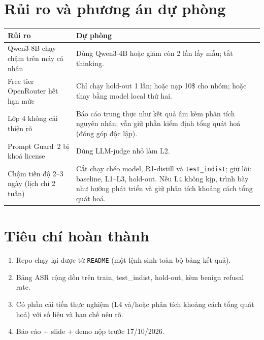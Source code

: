 \documentclass[11pt,a4paper]{article}
\newcommand{\code}[1]{\texttt{#1}}
\begin{document}
\section{Rủi ro và phương án dự phòng}
\begin{center}
\small
\begin{tabularx}{\linewidth}{@{}YY@{}}
\toprule
Rủi ro & Dự phòng\\
\midrule
Qwen3-8B chạy chậm trên máy cá nhân & Dùng Qwen3-4B hoặc giảm còn 2 lần lấy mẫu; tắt thinking.\\
Free tier OpenRouter hết hạn mức & Chỉ chạy hold-out 1 lần; hoặc nạp 10\$ cho nhóm; hoặc thay bằng model local thứ hai.\\
Lớp 4 không cải thiện rõ & Báo cáo trung thực như kết quả âm kèm phân tích nguyên nhân; vẫn giữ phần kiểm định tổng quát hoá (đóng góp độc lập).\\
Prompt Guard~2 bị khoá license & Dùng LLM-judge nhỏ làm L2.\\
Chậm tiến độ 2--3 ngày (lịch chỉ 2 tuần) & Cắt chạy chéo model, R1-distill và \code{test\_indist}; giữ lõi: baseline, L1--L3, hold-out. Nếu L4 không kịp, trình bày như hướng phát triển và giữ phân tích khoảng cách tổng quát hoá.\\
\bottomrule
\end{tabularx}
\end{center}

\section{Tiêu chí hoàn thành}
\begin{enumerate}
  \item Repo chạy lại được từ \code{README} (một lệnh sinh toàn bộ bảng kết quả).
  \item Bảng ASR cộng dồn trên train, test\_indist, hold-out, kèm benign refusal rate.
  \item Có phần cải tiến thực nghiệm (L4 và/hoặc phân tích khoảng cách tổng quát hoá) với số liệu và hạn chế nêu rõ.
  \item Báo cáo + slide + demo nộp trước 17/10/2026.
\end{enumerate}
\end{document}
